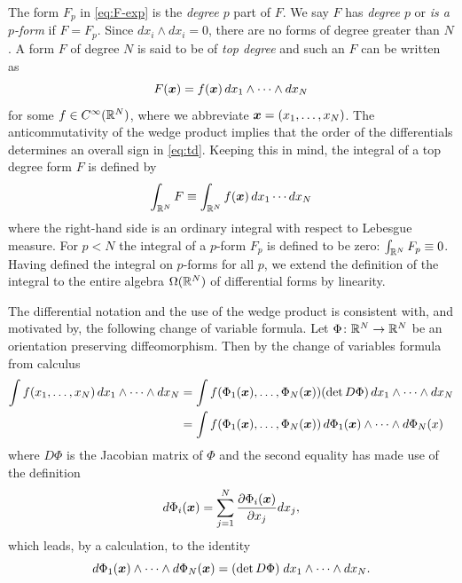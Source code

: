 \documentclass[11pt,a4paper]{article}
\begin{document}
The form $F_p$ in \eqref{eq:F-exp} is the \emph{degree
  $p$} part of $F$. We say $F$ has \emph{degree $p$} or
\emph{is a $p$-form} if $F=F_p$.
Since $dx_{i}\wedge dx_{i}=0$,
there are no forms of degree greater than $N$. A form $F$ of
degree $N$ is said to be of \emph{top degree} and such an $F$
can be written as
\begin{equation}
  \label{eq:td}
  F(\boldsymbol{x}) = f(\boldsymbol{x}) \, dx_1 \wedge \cdots \wedge dx_N
\end{equation}
for some $f\in C^{\infty}(\mathbb{R}^{N})$, where we abbreviate
$\boldsymbol{x} = (x_1,\dots, x_N)$.  The anticommutativity of the wedge
product implies that the order of the differentials determines an
overall sign in \eqref{eq:td}. Keeping this in mind, the integral of a
top degree form $F$ is defined by
\begin{equation}
  \int_{\mathbb{R}^N} F \equiv \int_{\mathbb{R}^N} f(\boldsymbol{x}) \, dx_1 \cdots dx_N
\end{equation}
where the right-hand side is an ordinary integral with respect to
Lebesgue measure.  For $p<N$ the integral of a $p$-form $F_{p}$ is
defined to be zero: $\int_{\mathbb{R}^{N}} F_{p} \equiv 0$.  Having defined
the integral on $p$-forms for all $p$, we extend the definition of the
integral to the entire algebra $\Omega(\mathbb{R}^{N})$ of differential forms
by linearity.


\begin{example}
\label{ex:CoV-df}
The differential notation and the use of the wedge product
is consistent with, and motivated by, the following change of variable formula.
Let $\Phi\colon \mathbb{R}^N\to\mathbb{R}^N$ be an orientation preserving
diffeomorphism. Then by the change of variables formula from
calculus
\begin{align}
  \int f(x_1, \dots, x_N) \, dx_1 \wedge \cdots \wedge dx_N
  &=
  \int f(\Phi_1(\boldsymbol{x}), \dots, \Phi_N(\boldsymbol{x})) (\det D\Phi) \, dx_1 \wedge \cdots \wedge dx_N
  \nonumber\\
  &=
    \int f(\Phi_1(\boldsymbol{x}), \dots, \Phi_N(\boldsymbol{x})) \, d\Phi_1(\boldsymbol{x}) \wedge \cdots \wedge d\Phi_N(x)
\end{align}
where $D\Phi$ is the Jacobian matrix of $\Phi$ and the second
equality has made use of the definition
\begin{equation}
  d\Phi_i(\boldsymbol{x}) = \sum_{j=1}^{N} \frac{\partial \Phi_i(\boldsymbol{x})}{\partial x_j} dx_j,
\end{equation}
which leads, by a calculation, to the identity
\begin{equation}
  d\Phi_{1}(\boldsymbol{x})\wedge \cdots \wedge d\Phi_{N}(\boldsymbol{x})
  = (\det D\Phi) \;
  dx_{1}\wedge \cdots \wedge dx_{N}.
\end{equation}
\end{example}
\end{document}
